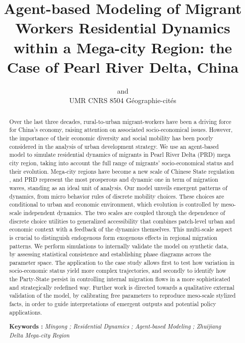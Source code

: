

\def \draft {1}



\title{Agent-based Modeling of Migrant Workers Residential Dynamics within a Mega-city Region: the Case of Pearl River Delta, China
}
\author{ and \\
UMR CNRS 8504 Géographie-cités
}
\date{}




\maketitle

\justify


\begin{abstract}
Over the last three decades, rural-to-urban migrant-workers have been a driving force for China's economy, raising attention on associated socio-economical issues. However, the importance of their economic diversity and social mobility has been poorly considered in the analysis of urban development strategy.
We use an agent-based model to simulate residential dynamics of migrants in Pearl River Delta (PRD) mega city region, taking into account the full range of migrants’ socio-economical status and their evolution. Mega-city regions have become a new scale of Chinese State regulation , and PRD represent the most prosperous and dynamic one in term of migration waves, standing as an ideal unit of analysis.
Our model unveils emergent patterns of dynamics, from micro behavior rules of discrete mobility choices. These choices are conditional to urban and economic environment, which evolution is controlled by meso-scale independent dynamics.
The two scales are coupled through the dependence of discrete choice utilities to generalized accessibility that combines patch-level urban and economic context with a feedback of the dynamics themselves. This multi-scale aspect is crucial to distinguish endogenous form exogenous effects in regional migration patterns.
We perform simulations to internally validate the model on synthetic data, by assessing statistical consistence and establishing phase diagrams across the parameter space.
The application to the case study allows first to test how variation in socio-economic status yield more complex trajectories, and secondly to identify how the Party-State persist in controlling internal migration flows in a more sophisticated and strategically redefined way.
Further work is directed towards a qualitative external validation of the model, by calibrating free parameters to reproduce meso-scale stylized facts, in order to guide interpretations of emergent outputs and potential policy applications.

\bigskip

\noindent\textbf{Keywords : } \textit{Mingong ; Residential Dynamics ; Agent-based Modeling ; Zhuijiang Delta Mega-city Region}
\end{abstract}




